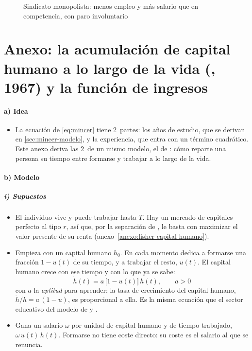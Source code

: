 \documentclass[11pt]{article}
\begin{document}
\begin{figure}[H]
\centering
\caption{Sindicato monopolista: menos empleo y más salario que en competencia, con paro involuntario}\label{fig:sindicato-monopolista}
\end{figure}

\section{Anexo: la acumulación de capital humano a lo largo de la vida\cortetitulo{} (, 1967) y la función de ingresos}\label{anexo:ben-porath}

\paragraph{a) Idea}

\begin{itemize}
\item La ecuación de  \eqref{eq:mincer} tiene 2~partes: los años de estudio, que se derivan en \ref{sec:mincer-modelo}, y la experiencia, que entra con un término cuadrático. Este anexo deriva las 2~de un mismo modelo, el de \textcite{BenPorath1967Production}: cómo reparte una persona su tiempo entre formarse y trabajar a lo largo de la vida.
\end{itemize}

\paragraph{b) Modelo}

\subparagraph{i) Supuestos}

\begin{itemize}
\item El individuo vive y puede trabajar hasta $T$. Hay un mercado de capitales perfecto al tipo $r$, así que, por la separación de , le basta con maximizar el valor presente de su renta (anexo~\ref{anexo:fisher-capital-humano}).
\item Empieza con un capital humano $h_0$. En cada momento dedica a formarse una fracción $1-u(t)$ de su tiempo, y a trabajar el resto, $u(t)$. El capital humano crece con ese tiempo y con lo que ya se sabe:
  \begin{equation}
  \dot h(t)=a\,\big[1-u(t)\big]\,h(t),\qquad a>0\label{eq:ben-porath}
  \end{equation}
  con $a$ la \emph{aptitud} para aprender: la tasa de crecimiento del capital humano, $\dot h/h=a\,(1-u)$, es proporcional a ella. Es la misma ecuación que el sector educativo del modelo de  y  .
\item Gana un salario $\omega$ por unidad de capital humano y de tiempo trabajado, $\omega\,u(t)\,h(t)$. Formarse no tiene coste directo: su coste es el salario al que se renuncia.
\end{itemize}
\end{document}
